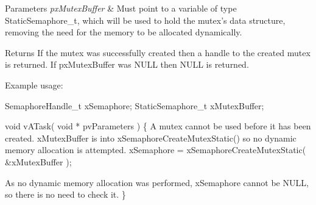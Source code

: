 \begin{DoxyParams}{Parameters}
{\em px\-Mutex\-Buffer} & Must point to a variable of type Static\-Semaphore\-\_\-t, which will be used to hold the mutex's data structure, removing the need for the memory to be allocated dynamically.\\
\hline
\end{DoxyParams}
\begin{DoxyReturn}{Returns}
If the mutex was successfully created then a handle to the created mutex is returned. If px\-Mutex\-Buffer was N\-U\-L\-L then N\-U\-L\-L is returned.
\end{DoxyReturn}
Example usage\-: 
\begin{DoxyPre}
 SemaphoreHandle\_t xSemaphore;
 StaticSemaphore\_t xMutexBuffer;\end{DoxyPre}



\begin{DoxyPre} void vATask( void * pvParameters )
 \{
A mutex cannot be used before it has been created.  xMutexBuffer is
into xSemaphoreCreateMutexStatic() so no dynamic memory allocation is
attempted.
    xSemaphore = xSemaphoreCreateMutexStatic( &xMutexBuffer );\end{DoxyPre}



\begin{DoxyPre}As no dynamic memory allocation was performed, xSemaphore cannot be NULL,
so there is no need to check it.
 \}
 \end{DoxyPre}
 